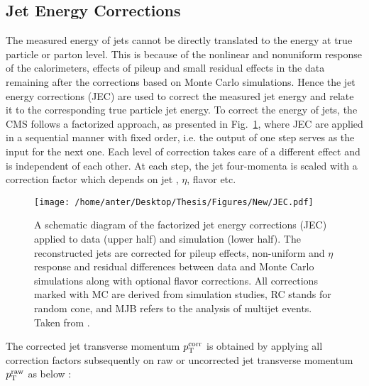 \subsection{Jet Energy Corrections}
\label{sec:jet_corrections}
The measured energy of jets cannot be directly translated to the energy at true particle or parton level. This is because of the nonlinear and nonuniform response of the calorimeters, effects of pileup and small residual effects in the data remaining after the corrections based on Monte Carlo simulations. Hence the jet energy corrections (JEC) \cite{Chatrchyan:2011ds, Khachatryan:2016kdb} are used to correct the measured jet energy and relate it to the corresponding true particle jet energy. To correct the energy of jets, the CMS follows a factorized approach, as presented in Fig.~\ref{fig:jec}, where JEC are applied in a sequential manner with fixed order, i.e. the output of one step serves as the input for the next one. Each level of correction takes care of a different effect and is independent of each other. At each step, the jet four-momenta is scaled with a correction factor which depends on jet \pt, $\eta$, flavor etc.

\begin{figure}[!h]
 \begin{center}
 \vspace*{4mm} 
 \hspace*{-11mm}
 \texttt{[image: /home/anter/Desktop/Thesis/Figures/New/JEC.pdf]}\\
 \vspace*{5mm}
 \caption[A schematic diagram of the factorized jet energy corrections (JEC).]{A schematic diagram of the factorized jet energy corrections (JEC) applied to data (upper half) and simulation (lower half). The reconstructed jets are corrected for pileup effects, non-uniform \pt and $\eta$ response and residual differences between data and Monte Carlo simulations along with optional flavor corrections. All corrections marked with MC are derived from simulation studies, RC stands for random cone, and MJB refers to the analysis of multijet events. Taken from \cite{Khachatryan:2016kdb}.}
 \label{fig:jec}
 \end{center}
\end{figure}

The corrected jet transverse momentum $p^{\rm corr}_{\rm T}$ is obtained by applying all correction factors subsequently on raw or uncorrected jet transverse momentum $p^{\rm raw}_{\rm T}$ as below :

